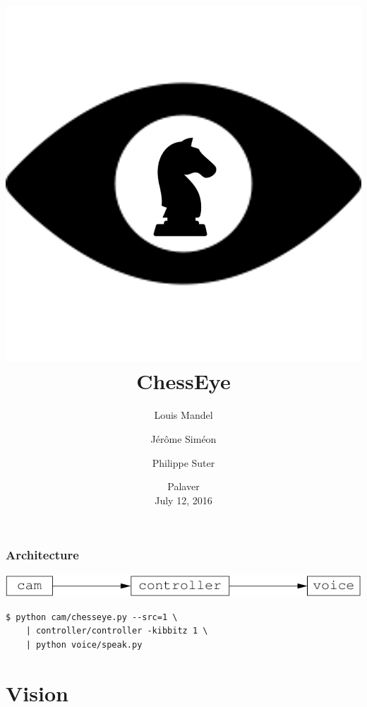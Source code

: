 \documentclass[t]{beamer}
\title{\includegraphics[scale=0.1]{figures/chesseye}
  \\
  ChessEye}
\author{Louis Mandel \and J{\'e}r{\^o}me Sim{\'e}on \and Philippe Suter}
\date{Palaver \\ July 12, 2016}
\begin{document}

\begin{frame}
  \titlepage
\end{frame}




\begin{frame}[fragile]
\frametitle{Architecture}

\begin{center}
  \includegraphics[scale=0.9]{figures/architecture}
\end{center}
\medskip

{\small
\begin{verbatim}
$ python cam/chesseye.py --src=1 \
    | controller/controller -kibbitz 1 \
    | python voice/speak.py
\end{verbatim}
}

\end{frame}


\section{Vision}
\end{document}
